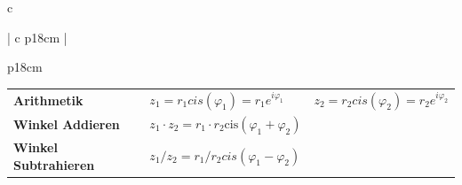 \begin{tabular}{c}
\begin{tabular}{ | c   p{18cm} |}
\begin{tabular}{p{18cm}}
\begin{tabular}{L{5cm} L{7.8cm} L{3.8cm}}
			\textbf{Arithmetik}&
			$z_1 = r_1 cis(\varphi_1)= r_1e^{i\varphi_1}$&
			$z_2 = r_2 cis(\varphi_2)= r_2e^{i\varphi_2}$		\\
			
			\textbf{Winkel Addieren}&$z_1\cdot z_2 = r_1\cdot r_2 \text{cis}(\varphi_1+\varphi_2)$&	\\
			
			\textbf{Winkel Subtrahieren}&$z_1/ z_2 = r_1/r_2 cis(\varphi_1-\varphi_2)$&	\\[5pt]
			
			
			
			
			
		\end{tabular}\\[5pt]
	\end{tabular}\\
	\hline	
\end{tabular}

	
\end{tabular}
	
